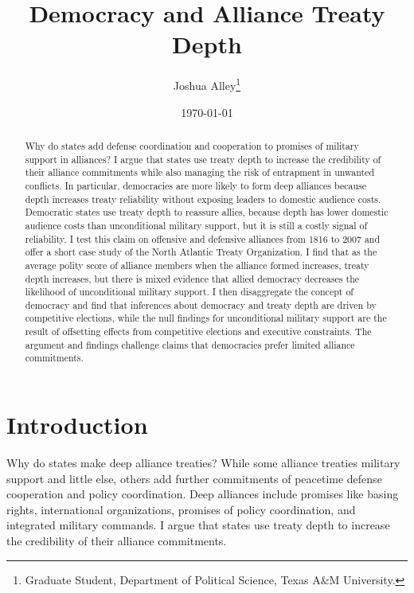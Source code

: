 \documentclass[12pt]{article}
\title{\textbf{Democracy and Alliance Treaty Depth}}
\author{Joshua Alley\footnote{Graduate Student,
Department of Political Science, Texas A\&M University.}}
\date{\today}
\begin{document}
\maketitle 

\doublespace 

\begin{abstract}
Why do states add defense coordination and cooperation to promises of military support in alliances? 
I argue that states use treaty depth to increase the credibility of their alliance commitments while also managing the risk of entrapment in unwanted conflicts. 
In particular, democracies are more likely to form deep alliances because depth increases treaty reliability without exposing leaders to domestic audience costs. 
Democratic states use treaty depth to reassure allies, because depth has lower domestic audience costs than unconditional military support, but it is still a costly signal of reliability.
I test this claim on offensive and defensive alliances from 1816 to 2007 and offer a short case study of the North Atlantic Treaty Organization.
I find that as the average polity score of alliance members when the alliance formed increases, treaty depth increases, but there is mixed evidence that allied democracy decreases the likelihood of unconditional military support. 
I then disaggregate the concept of democracy and find that inferences about democracy and treaty depth are driven by competitive elections, while the null findings for unconditional military support are the result of offsetting effects from competitive elections and executive constraints.  
The argument and findings challenge claims that democracies prefer limited alliance commitments. 
\end{abstract}


\newpage 


\section{Introduction}


Why do states make deep alliance treaties? 
While some alliance treaties military support and little else, others add further commitments of peacetime defense cooperation and policy coordination. 
Deep alliances include promises like basing rights, international organizations, promises of policy coordination, and integrated military commands.
I argue that states use treaty depth to increase the credibility of their alliance commitments. 
\end{document}
